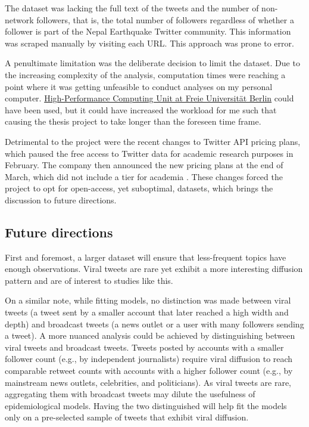 \documentclass[11pt,a4paper]{article}
\begin{document}
    The dataset was lacking the full text of the tweets and the number of non-network followers, that is, the total number of followers regardless of whether a follower is part of the Nepal Earthquake Twitter community. This information was scraped manually by visiting each URL. This approach was prone to error.
    
    A penultimate limitation was the deliberate decision to limit the dataset. Due to the increasing complexity of the analysis, computation times were reaching a point where it was getting unfeasible to conduct analyses on my personal computer. \hyperref[https://www.fu-berlin.de/en/sites/high-performance-computing/index.html]{High-Performance Computing Unit at Freie Universität Berlin}  could have been used, but it could have increased the workload for me such that causing the thesis project to take longer than the foreseen time frame.
    
    Detrimental to the project were the recent changes to Twitter API pricing plans,  which paused the free access to Twitter data \cite{center_for_an_informed_public_at_university_of_washington_twitters_2023} for academic research purposes in February. The company then announced the new pricing plans at the end of March, which did not include a tier for academia \cite{developers_xdevelopers_today_2023}. These changes forced the project to opt for open-access, yet suboptimal, datasets, which brings the discussion to future directions.
    
    \subsection{Future directions}
    First and foremost, a larger dataset will ensure that less-frequent topics have enough observations. Viral tweets are rare \cite{goel_structural_2016, goel_note_2015} yet exhibit a more interesting diffusion pattern and are of interest to studies like this.

    On a similar note, while fitting models, no distinction was made between viral tweets (a tweet sent by a smaller account that later reached a high width and depth) and broadcast tweets (a news outlet or a user with many followers sending a tweet). A more nuanced analysis could be achieved by distinguishing between viral tweets and broadcast tweets. Tweets posted by accounts with a smaller follower count (e.g., by independent journalists) require viral diffusion to reach comparable retweet counts with accounts with a higher follower count (e.g., by mainstream news outlets, celebrities, and politicians). As viral tweets are rare, aggregating them with broadcast tweets may dilute the usefulness of epidemiological models. Having the two distinguished will help fit the models only on a pre-selected sample of tweets that exhibit viral diffusion. 
\end{document}
